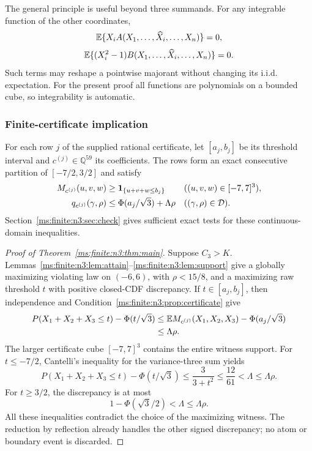 The general principle is useful beyond three summands. For any integrable
function of the other coordinates,
\[
 \mathbb E\{X_i A(X_1,\ldots,\widehat X_i,\ldots,X_n)\}=0,
\]
\[
 \mathbb E\{(X_i^2-1)B(X_1,\ldots,\widehat X_i,\ldots,X_n)\}=0.
\]
Such terms may reshape a pointwise majorant without changing its i.i.d.
expectation. For the present proof all functions are polynomials on a
bounded cube, so integrability is automatic.

\subsubsection{Finite-certificate implication}
\begin{condition}\label{ms:finite:n3:prop:certificate}
For each row $j$ of the supplied rational certificate, let $[a_j,b_j]$
be its threshold interval and $c^{(j)}\in\mathbb Q^{59}$ its coefficients.
The rows form an exact consecutive partition of $[-7/2,3/2]$ and satisfy
\begin{align}
 M_{c^{(j)}}(u,v,w)&\ge\mathbf 1_{\{u+v+w\le b_j\}}
       &&((u,v,w)\in[-7,7]^3),\label{ms:finite:n3:eq:pointwise}\\
 q_{c^{(j)}}(\gamma,\rho)&\le
      \Phi(a_j/\sqrt3)+\Lambda\rho
       &&((\gamma,\rho)\in\mathcal D).\label{ms:finite:n3:eq:scalar}
\end{align}
Section~\ref{ms:finite:n3:sec:check} gives sufficient exact tests for these
continuous-domain inequalities.
\end{condition}

\begin{proof}[Proof of Theorem~\ref{ms:finite:n3:thm:main}]
Suppose $C_3>K$. Lemmas~\ref{ms:finite:n3:lem:attain}--\ref{ms:finite:n3:lem:support} give a globally
maximizing violating law on $(-6,6)$, with $\rho<15/8$, and a maximizing
raw threshold $t$ with positive closed-CDF discrepancy.
If $t\in[a_j,b_j]$, then independence and Condition~\ref{ms:finite:n3:prop:certificate}
give
\begin{align*}
 P(X_1+X_2+X_3\le t)-\Phi(t/\sqrt3)
 &\le\mathbb E M_{c^{(j)}}(X_1,X_2,X_3)-\Phi(a_j/\sqrt3)\\
 &\le\Lambda\rho.
\end{align*}
The larger certificate cube $[-7,7]^3$ contains the entire witness support.
For $t\le-7/2$, Cantelli's inequality for the variance-three sum yields
\[
 P(X_1+X_2+X_3\le t)-\Phi(t/\sqrt3)
 \le\frac3{3+t^2}\le\frac{12}{61}<\Lambda\le\Lambda\rho.
\]
For $t\ge3/2$, the discrepancy is at most
\[
 1-\Phi(\sqrt3/2)<\Lambda\le\Lambda\rho.
\]
All these inequalities contradict the choice of the maximizing witness.
The reduction by reflection already handles the other signed discrepancy;
no atom or boundary event is discarded.
\end{proof}

